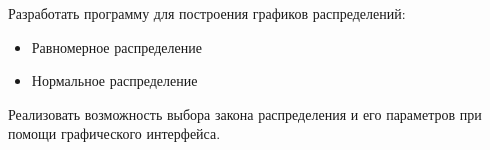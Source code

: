 Разработать программу для построения графиков распределений:
\begin{itemize}
	\item Равномерное распределение
	\item Нормальное распределение
\end{itemize}

Реализовать возможность выбора закона распределения и его параметров при помощи графического интерфейса.
